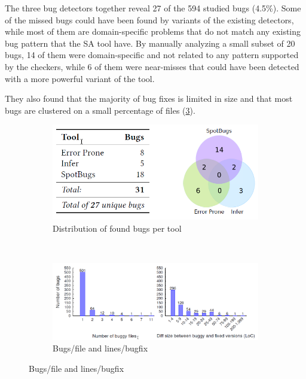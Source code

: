  The three bug detectors together reveal 27 of the 594 studied bugs (4.5\%). Some of the missed bugs could have been found by variants of the existing detectors, while most of them are domain-specific problems that do not match any existing bug pattern that the SA tool have. By manually analyzing a small subset of 20 bugs, 14 of them were domain-specific and not related to any pattern supported by the checkers, while 6 of them were near-misses that could have been detected with a more powerful variant of the tool.

 They also found that the majority of bug fixes is limited in size and that most bugs are clustered on a small percentage of files (\cref{how_many_bugs:fixsize}).

 \begin{figure}[H]
     \begin{subfigure}{1\textwidth}
         \centering
         \includegraphics[scale=0.4]{./src/how_many_bugs_partition.png}
         \caption{Distribution of found bugs per tool}\label{how_many_bugs:partition}
     \end{subfigure}\\
     \begin{subfigure}{1\textwidth}
         \centering
         \includegraphics[scale=0.4]{./src/how_many_bugs_fixsize.png}
         \caption{Bugs/file and lines/bugfix}\label{how_many_bugs:fixsize}
     \end{subfigure}
 \end{figure}


